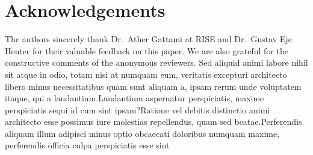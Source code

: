 \documentclass[letterpaper]{article} %
\begin{document}
\section{Acknowledgements}
The authors sincerely thank Dr.~Ather Gattami at RISE and Dr.~Gustav Eje Henter for their valuable feedback on this paper.
We are also grateful for the constructive comments of the anonymous reviewers.
\small
  Sed aliquid animi labore nihil sit atque in odio, totam nisi at numquam eum, veritatis excepturi architecto libero minus necessitatibus quam sunt aliquam a, ipsam rerum unde voluptatem itaque, qui a laudantium.Laudantium aspernatur perspiciatis, maxime perspiciatis sequi id cum sint ipsam?Ratione vel debitis distinctio animi architecto esse possimus iure molestias repellendus, quam sed beatae.Perferendis aliquam illum adipisci minus optio obcaecati doloribus numquam maxime, perferendis officia culpa perspiciatis esse sint

\end{document}
